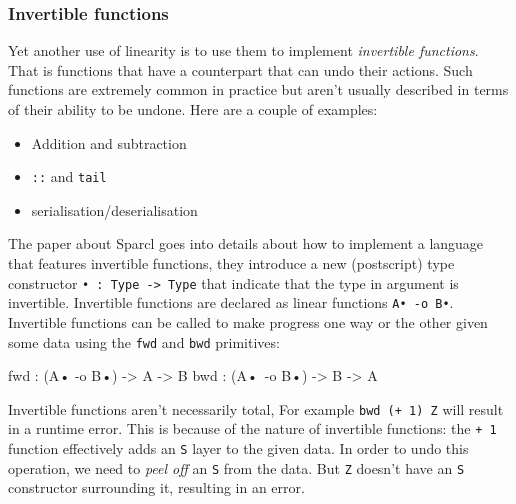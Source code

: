 \documentclass[
]{article}
\newenvironment{Shaded}{}{}
\newcommand{\DataTypeTok}[1]{\textcolor[rgb]{0.56,0.13,0.00}{#1}}
\newcommand{\NormalTok}[1]{#1}
\newcommand{\OperatorTok}[1]{\textcolor[rgb]{0.40,0.40,0.40}{#1}}
\newcommand{\OtherTok}[1]{\textcolor[rgb]{0.00,0.44,0.13}{#1}}
\providecommand{\tightlist}{%
  \setlength{\itemsep}{0pt}\setlength{\parskip}{0pt}}
\begin{document}
\hypertarget{invertible-functions}{%
\subsubsection{Invertible functions}\label{invertible-functions}}

Yet another use of linearity is to use them to implement
\emph{invertible functions}. That is functions that have a counterpart
that can undo their actions. Such functions are extremely common in
practice but aren't usually described in terms of their ability to be
undone. Here are a couple of examples:

\begin{itemize}
\tightlist
\item
  Addition and subtraction
\item
  \texttt{::} and \texttt{tail}
\item
  serialisation/deserialisation
\end{itemize}

The paper about Sparcl\cite{invertible_functions} goes into details
about how to implement a language that features invertible functions,
they introduce a new (postscript) type constructor
\texttt{•\ :\ Type\ -\textgreater{}\ Type} that indicate that the type
in argument is invertible. Invertible functions are declared as linear
functions \texttt{A•\ -o\ B•}. Invertible functions can be called to
make progress one way or the other given some data using the
\texttt{fwd} and \texttt{bwd} primitives:

\begin{Shaded}
\begin{Highlighting}[]
\NormalTok{fwd }\OperatorTok{:}\NormalTok{ (}\DataTypeTok{A}\NormalTok{• }\OperatorTok{{-}}\NormalTok{o }\DataTypeTok{B}\NormalTok{•) }\OtherTok{{-}\textgreater{}} \DataTypeTok{A} \OtherTok{{-}\textgreater{}} \DataTypeTok{B}
\NormalTok{bwd }\OperatorTok{:}\NormalTok{ (}\DataTypeTok{A}\NormalTok{• }\OperatorTok{{-}}\NormalTok{o }\DataTypeTok{B}\NormalTok{•) }\OtherTok{{-}\textgreater{}} \DataTypeTok{B} \OtherTok{{-}\textgreater{}} \DataTypeTok{A}
\end{Highlighting}
\end{Shaded}

Invertible functions aren't necessarily total, For example
\texttt{bwd\ (+\ 1)\ Z} will result in a runtime error. This is because
of the nature of invertible functions: the \texttt{+\ 1} function
effectively adds an \texttt{S} layer to the given data. In order to undo
this operation, we need to \emph{peel off} an \texttt{S} from the data.
But \texttt{Z} doesn't have an \texttt{S} constructor surrounding it,
resulting in an error.
\end{document}
